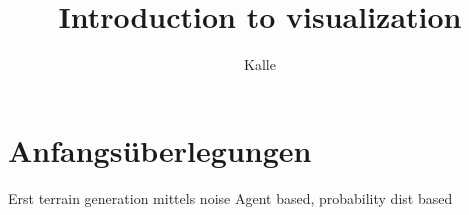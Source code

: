 \documentclass{scrartcl}
\title{Introduction to visualization}
\author{Kalle}
\begin{document}
\maketitle
\tableofcontents
\newpage

\section{Anfangsüberlegungen}
Erst terrain generation mittels noise
Agent based, probability dist based
\end{document}
